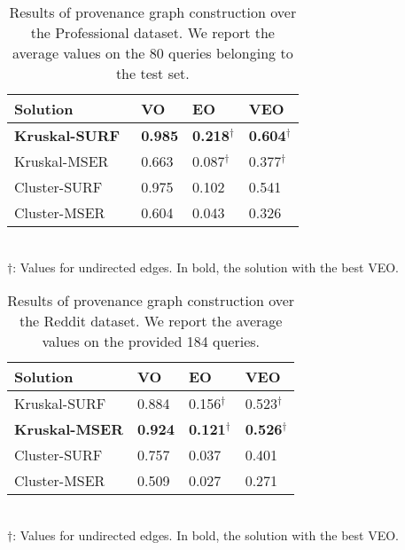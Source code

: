 \begin{table}[!t]
\renewcommand{\arraystretch}{1.6}
\caption{Results of provenance graph construction over the Professional dataset.
We report the average values on the 80 queries belonging to the test set.}
\centering
\begin{tabular}{R{2.1cm}C{1.4cm}C{1.4cm}C{1.4cm}}
    \hline
    Solution & VO & EO & VEO\\ %
    \hline
    \textbf{Kruskal-SURF}~\cite{bharati2017uphy} & \textbf{0.985} & \textbf{0.218}$^\dagger$ & \textbf{0.604}$^\dagger$\\ %
    Kruskal-MSER & 0.663 & 0.087$^\dagger$ & 0.377$^\dagger$\\ %
    Cluster-SURF  & 0.975 & 0.102 & 0.541\\ %
    Cluster-MSER  & 0.604 & 0.043 & 0.326\\ %
    \hline
\end{tabular}
\vspace{0.1cm}\\
$\dagger$: Values for undirected edges. In bold, the solution with the best VEO.
\label{tab:prof}
\vspace{0.3cm}
\end{table}

\begin{table}[!t]
\renewcommand{\arraystretch}{1.6}
\caption{Results of provenance graph construction over the Reddit dataset.
We report the average values on the provided 184 queries.}
\centering
\begin{tabular}{R{2.1cm}C{1.4cm}C{1.4cm}C{1.4cm}}
    \hline
    Solution & VO & EO & VEO\\ %
    \hline
    Kruskal-SURF~\cite{bharati2017uphy} & 0.884 & 0.156$^\dagger$ & 0.523$^\dagger$\\ %
    \textbf{Kruskal-MSER} & \textbf{0.924} & \textbf{0.121}$^\dagger$ & \textbf{0.526}$^\dagger$\\ %
    Cluster-SURF  & 0.757 & 0.037 & 0.401\\ %
    Cluster-MSER  & 0.509 & 0.027 & 0.271\\ %
    \hline
\end{tabular}
\vspace{0.1cm}\\
$\dagger$: Values for undirected edges. In bold, the solution with the best VEO.
\label{tab:reddit}
\end{table}

